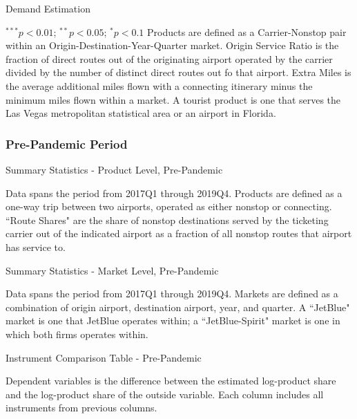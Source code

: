 \documentclass{article}
\begin{document}
\begin{appendices}
	\begin{table}
		\caption{Demand Estimation}
		\label{tab:DemandEstimation_OriginalInstruments}
		
		\footnotesize{$^{***}p<0.01$; $^{**}p<0.05$; $^{*}p<0.1$ Products are defined as a Carrier-Nonstop pair within an Origin-Destination-Year-Quarter market. Origin Service Ratio is the fraction of direct routes out of the originating airport operated by the carrier divided by the number of distinct direct routes out fo that airport. Extra Miles is the average additional miles flown with a connecting itinerary minus the minimum miles flown within a market.  A tourist product is one that serves the Las Vegas metropolitan statistical area or an airport in Florida.}
	\end{table}
	
	
	\FloatBarrier
	
	\subsubsection{Pre-Pandemic Period}
	
	\begin{table}
		\caption{Summary Statistics - Product Level, Pre-Pandemic}
		\label{tab:SummaryStatistics_Products_Pre}
		
		\footnotesize{Data spans the period from 2017Q1 through 2019Q4. Products are defined as a one-way trip between two airports, operated as either nonstop or connecting. ``Route Shares" are the share of nonstop destinations served by the ticketing carrier out of the indicated airport as a fraction of all nonstop routes that airport has service to.}
	\end{table}
	
	\begin{table}
		\caption{Summary Statistics - Market Level, Pre-Pandemic}
		\label{tab:SummaryStatistics_Market_Pre}
		
		\footnotesize{Data spans the period from 2017Q1 through 2019Q4. Markets are defined as a combination of origin airport, destination airport, year, and quarter. A ``JetBlue" market is one that JetBlue operates within; a ``JetBlue-Spirit" market is one in which both firms operates within. }
	\end{table}
	
	\begin{landscape}
		\begin{table}
			\caption{Instrument Comparison Table - Pre-Pandemic}
			\label{tab:Instrument_Compare_Pre}
			
			\footnotesize{Dependent variables is the difference between the estimated log-product share and the log-product share of the outside variable. Each column includes all instruments from previous columns.}
		\end{table}
	\end{landscape}
	

\end{appendices}
\end{document}
